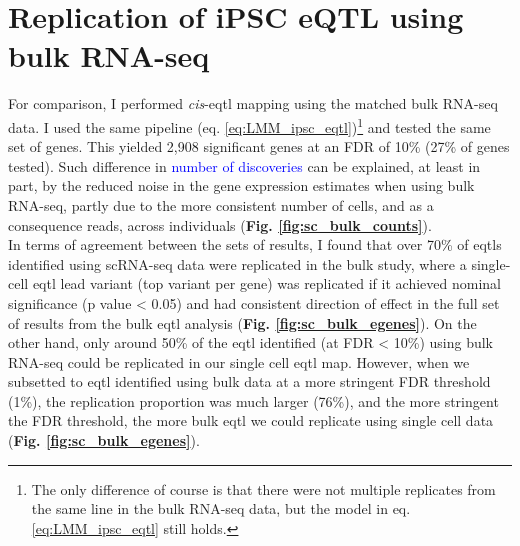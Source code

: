 \newpage

\section{Replication of iPSC eQTL using bulk RNA-seq}

For comparison, I performed \textit{cis}-\gls{eqtl} mapping using the matched bulk RNA-seq data.
I used the same pipeline (eq. \eqref{eq:LMM_ipsc_eqtl})\footnote{The only difference of course is that there were not multiple replicates from the same line in the bulk RNA-seq data, but the model in eq. \eqref{eq:LMM_ipsc_eqtl} still holds.} and tested the same set of genes. 
This yielded 2,908 significant genes at an FDR of 10\%
(27\% of genes tested).
Such difference in \textcolor{blue}{number of discoveries} can be explained, at least in part, by the reduced noise in the gene expression estimates when using bulk RNA-seq, partly due to the more consistent number of cells, and as a consequence reads, across individuals (\textbf{Fig. \ref{fig:sc_bulk_counts}}).
\\

In terms of agreement between the sets of results, I found that over 70\% of \glspl{eqtl} identified using scRNA-seq data were replicated in the bulk study, where a single-cell \gls{eqtl} lead variant (top variant per gene) was replicated if it achieved nominal significance (p value < 0.05) and had consistent direction of effect in the full set of results from the bulk \gls{eqtl} analysis (\textbf{Fig. \ref{fig:sc_bulk_egenes}}). 
On the other hand, only around 50\% of the \gls{eqtl} identified (at FDR < 10\%) using bulk RNA-seq could be replicated
in our single cell \gls{eqtl} map.
However, when we subsetted to \gls{eqtl} identified using bulk data at a more stringent FDR threshold (1\%), the replication proportion was much larger (76\%), and the more stringent the FDR threshold, the more bulk \gls{eqtl} we could replicate using single cell data (\textbf{Fig. \ref{fig:sc_bulk_egenes}}).

